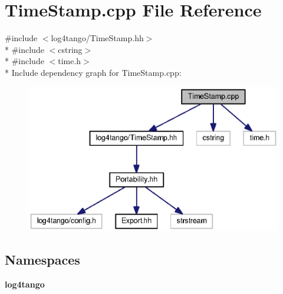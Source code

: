 \section{Time\-Stamp.\-cpp File Reference}
\label{TimeStamp_8cpp}
{\ttfamily \#include $<$log4tango/\-Time\-Stamp.\-hh$>$}\\*
{\ttfamily \#include $<$cstring$>$}\\*
{\ttfamily \#include $<$time.\-h$>$}\\*
Include dependency graph for Time\-Stamp.\-cpp\-:
\nopagebreak
\begin{figure}[H]
\begin{center}
\leavevmode
\includegraphics[width=350pt]{da/d5a/TimeStamp_8cpp__incl}
\end{center}
\end{figure}
\subsection*{Namespaces}
\begin{DoxyCompactItemize}
\item 
{\bf log4tango}
\end{DoxyCompactItemize}
